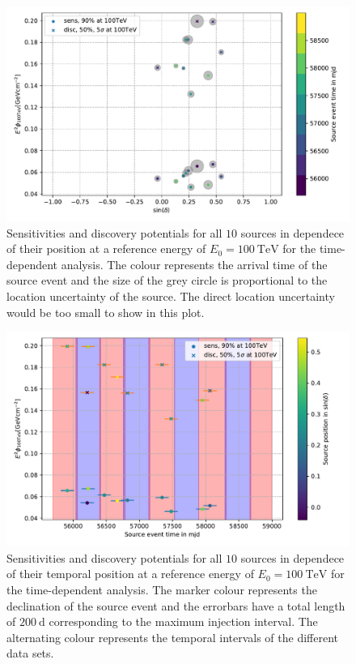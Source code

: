 \begin{figure}
    \centering
    \includegraphics[width=\linewidth]{Plots/05_csky/time_dep_sens_disc_dec_time.pdf}
    \caption{Sensitivities and discovery potentials for all $\num{10}$ sources in dependece of their position at a reference energy of $E_0 = \SI{100}{\tera\electronvolt}$ for the time-dependent analysis. The colour represents the arrival time of the source event and the size of the grey circle is proportional to the location uncertainty of the source. The direct location uncertainty would be too small to show in this plot.}
    \label{fig:sources_and_datasets}
\end{figure}
\begin{figure}
    \centering
    \includegraphics[width=\linewidth]{Plots/05_csky/time_dep_sens_disc_time.pdf}
    \caption{Sensitivities and discovery potentials for all $\num{10}$ sources in dependece of their temporal position at a reference energy of $E_0 = \SI{100}{\tera\electronvolt}$ for the time-dependent analysis. The marker colour represents the declination of the source event and the errorbars have a total length of $\SI{200}{\day}$ corresponding to the maximum injection interval. The alternating colour represents the temporal intervals of the different data sets.}
    \label{fig:sens_disc_time_dep_dec}
\end{figure}
